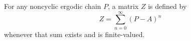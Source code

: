 For any noncyclic ergodic chain $P$, a matrix $Z$ is defined by
$$Z = \sum_{n=0}^{\infty} (P - A)^n$$
whenever that sum exists and is finite-valued.
